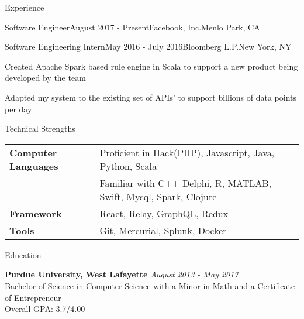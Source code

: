 \documentclass{resume} %
\begin{document}
\begin{rSection}{Experience}
\begin{rSubsection}{Software Engineer}{August 2017 - Present}{Facebook, Inc.}{Menlo Park, CA}
\end{rSubsection}

\begin{rSubsection}{Software Engineering Intern}{May 2016 - July 2016}{Bloomberg L.P.}{New York, NY}
\item Created Apache Spark based rule engine in Scala to support a new product being developed by the team
\item Adapted my system to the existing set of APIs'  to support billions of data points per day
\end{rSubsection}

\end{rSection}
\begin{rSection}{Technical Strengths}

\begin{tabular}{ @{} >{\bfseries}l @{\hspace{6ex}} l }
Computer Languages & Proficient in Hack(PHP), Javascript, Java, Python, Scala \\& Familiar with C++ Delphi, R, MATLAB, Swift, Mysql, Spark, Clojure \\
Framework & React, Relay, GraphQL, Redux\\
Tools & Git, Mercurial, Splunk, Docker \\

\end{tabular}

\end{rSection}

\begin{rSection}{Education}

{\bf Purdue University, West Lafayette} \hfill {\em August 2013 - May 2017} \\ 
Bachelor of Science in Computer Science with a Minor in Math and a Certificate of Entrepreneur \\
Overall GPA: 3.7/4.00

\end{rSection}



%
%
%
%
%
%

\end{document}
